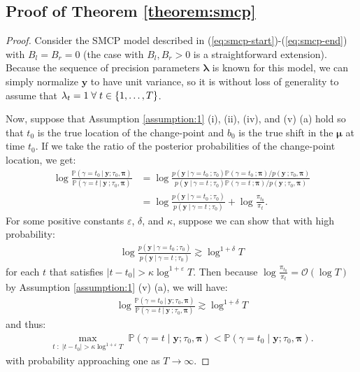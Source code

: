\subsection{Proof of Theorem \ref{theorem:smcp}}
\label{app:localization-smcp}

\begin{proof}
Consider the SMCP model described in (\ref{eq:smcp-start})-(\ref{eq:smcp-end}) with $B_l = B_r =0$ (the case with $B_l,B_r>0$ is a straightforward extension). Because the sequence of precision parameters $\pmb{\lambda}$ is known for this model, we can simply normalize $\mathbf{y}$ to have unit variance, so it is without loss of generality to assume that $\lambda_t = 1 \;\forall\; t \in \{1,\ldots,T\}$.

Now, suppose that Assumption \ref{assumption:1} (i), (ii), (iv), and (v) (a) hold so that $t_0$ is the true location of the change-point and $b_0$ is the true shift in the $\pmb{\mu}$ at time $t_0$. If we take the ratio of the posterior probabilities of the change-point location, we get:
\begin{align*}
    \log \frac{\mathbb{P}(\gamma = t_0  \:|\: \mathbf{y} ; \tau_0,\pmb{\pi})}{\mathbb{P}(\gamma = t  \:|\: \mathbf{y} \:; \tau_0,\pmb{\pi})} &=  \log \frac{p(\mathbf{y} \:|\:\gamma = t_0 \:; \tau_0)\mathbb{P}(\gamma = t_0 \:; \pmb{\pi})/ p(\mathbf{y}\:;\tau_0,\pmb{\pi})}{p(\mathbf{y} \:|\:\gamma = t \:; \tau_0)\mathbb{P}(\gamma = t \:;\pmb{\pi})/ p(\mathbf{y}\:;\tau_0,\pmb{\pi})} \tag{Bayes' rule} \\
    &= \log \frac{p(\mathbf{y} \:|\:\gamma = t_0 \:; \tau_0)}{p(\mathbf{y} \:|\:\gamma = t \:; \tau_0)} + \log \frac{\pi_{t_0}}{\pi_t}.
\end{align*}
For some positive constants $\varepsilon$, $\delta$, and $\kappa$, suppose we can show that with high probability:
\begin{align}
    \log \frac{p(\mathbf{y} \:|\:\gamma = t_0 \:; \tau_0)}{p(\mathbf{y} \:|\:\gamma = t \:; \tau_0)} \gtrsim \log^{1+\delta} T \label{eq:thm2-result}
\end{align}
for each $t$ that satisfies $|t-t_0| > \kappa \log^{1+\varepsilon}T$. Then because $\log \frac{\pi_{t_0}}{\pi_t} = \mathcal{O}(\log T)$ by Assumption \ref{assumption:1} (v) (a), we will have:
\begin{align*}
    \log \frac{\mathbb{P}(\gamma = t_0  \:|\: \mathbf{y} ; \tau_0,\pmb{\pi})}{\mathbb{P}(\gamma = t  \:|\: \mathbf{y} \:; \tau_0,\pmb{\pi})} \gtrsim \log^{1+\delta} T 
\end{align*}
and thus:
\begin{align*}
    \max_{t \;:\; |t - t_0| > \kappa \log^{1+\varepsilon} T} \; \mathbb{P}(\gamma = t  \;|\; \mathbf{y} ; \tau_0,\pmb{\pi}) < \mathbb{P}(\gamma = t_0  \;|\; \mathbf{y} ; \tau_0,\pmb{\pi}).
\end{align*}
with probability approaching one as $T \to \infty$. 


\end{proof}
